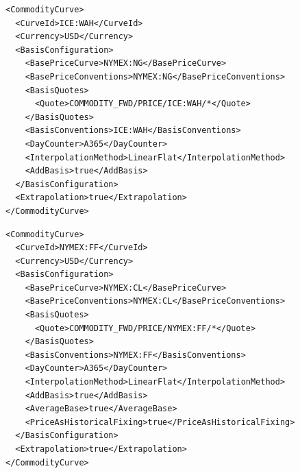 \begin{longlisting}
\begin{verbatim}
<CommodityCurve>
  <CurveId>ICE:WAH</CurveId>
  <Currency>USD</Currency>
  <BasisConfiguration>
    <BasePriceCurve>NYMEX:NG</BasePriceCurve>
    <BasePriceConventions>NYMEX:NG</BasePriceConventions>
    <BasisQuotes>
      <Quote>COMMODITY_FWD/PRICE/ICE:WAH/*</Quote>
    </BasisQuotes>
    <BasisConventions>ICE:WAH</BasisConventions>
    <DayCounter>A365</DayCounter>
    <InterpolationMethod>LinearFlat</InterpolationMethod>
    <AddBasis>true</AddBasis>
  </BasisConfiguration>
  <Extrapolation>true</Extrapolation>
</CommodityCurve>
\end{verbatim}
\caption{Commodity curve configuration for ICE Waha}
\label{lst:commodity_crv_config_ice_waha}
\end{longlisting}

\begin{longlisting}
\begin{verbatim}
<CommodityCurve>
  <CurveId>NYMEX:FF</CurveId>
  <Currency>USD</Currency>
  <BasisConfiguration>
    <BasePriceCurve>NYMEX:CL</BasePriceCurve>
    <BasePriceConventions>NYMEX:CL</BasePriceConventions>
    <BasisQuotes>
      <Quote>COMMODITY_FWD/PRICE/NYMEX:FF/*</Quote>
    </BasisQuotes>
    <BasisConventions>NYMEX:FF</BasisConventions>
    <DayCounter>A365</DayCounter>
    <InterpolationMethod>LinearFlat</InterpolationMethod>
    <AddBasis>true</AddBasis>
    <AverageBase>true</AverageBase>
    <PriceAsHistoricalFixing>true</PriceAsHistoricalFixing>
  </BasisConfiguration>
  <Extrapolation>true</Extrapolation>
</CommodityCurve>
\end{verbatim}
\caption{Commodity curve configuration for WTI Midland (Argus)}
\label{lst:commodity_crv_config_cme_ff}
\end{longlisting}

